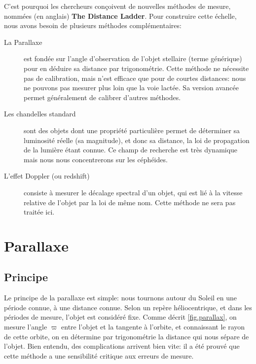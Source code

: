 \documentclass[12pt,a4paper,french]{scrartcl}
\begin{document}
C'est pourquoi les chercheurs conçoivent de nouvelles méthodes de mesure, nommées (en anglais) \textbf{The Distance Ladder}.
Pour construire cette échelle, nous avons besoin de plusieurs méthodes complémentaires:

\begin{description}
    \item[La Parallaxe] est fondée sur l'angle d'observation de l'objet stellaire (terme générique)
        pour en déduire sa distance par trigonométrie. Cette méthode ne nécessite pas de calibration, mais n'est efficace que pour de courtes distances: 
        nous ne pouvons pas mesurer plus loin que la voie lactée.
        Sa version avancée permet généralement de calibrer d'autres méthodes.
    \item[Les chandelles standard] sont des objets dont une propriété particulière permet de déterminer sa luminosité réelle (sa magnitude),
        et donc sa distance, la loi de propagation de la lumière étant connue. 
        Ce champ de recherche est très dynamique mais nous nous concentrerons sur les céphéides.
    \item[L'effet Doppler (ou redshift)] consiste à mesurer le décalage spectral d'un objet, qui est lié à la vitesse relative de l'objet par la loi de même nom. 
        Cette méthode ne sera pas traitée ici.
\end{description}

\section{Parallaxe}
\subsection{Principe}

Le principe de la parallaxe est simple: nous tournons autour du Soleil en une période connue, à une distance connue. 
Selon un repère héliocentrique, et dans les périodes de mesure, l'objet est considéré fixe. %
Comme décrit \cref{fig.parallax}, on mesure l'angle $\varpi$ entre l'objet et la tangente à l'orbite, 
et connaissant le rayon de cette orbite, on en détermine par trigonométrie la distance qui nous sépare de l'objet.
Bien entendu, des complications arrivent bien vite: il a été prouvé que cette méthode a une sensibilité critique aux erreurs de mesure.
\end{document}
